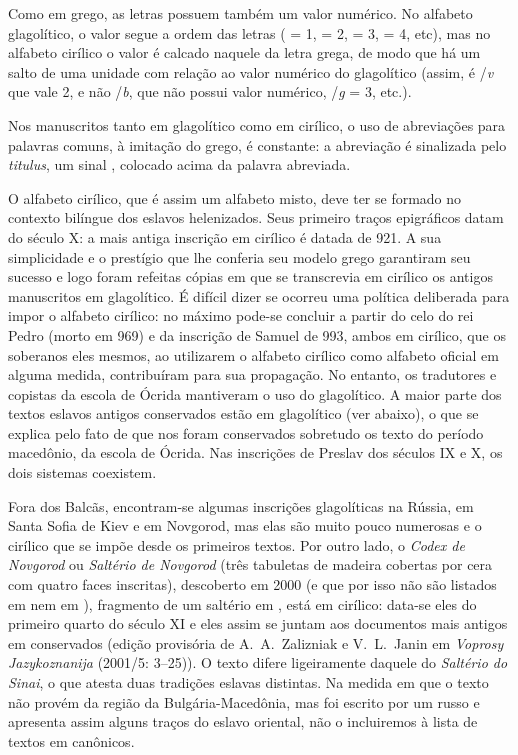 


Como em grego, as letras possuem também um valor numérico.
No alfabeto glagolítico, o valor segue a ordem das letras ( = 1,
 = 2,  = 3,  = 4, etc), mas no alfabeto
cirílico o valor é calcado naquele da letra grega, de modo que há um salto de
uma unidade com relação ao valor numérico do glagolítico (assim, é
\slash{}\emph{v} que vale 2, e não \slash{}\emph{b}, que não possui valor
numérico, \slash{}\emph{g} = 3, etc.).

Nos manuscritos tanto em glagolítico como em cirílico, o uso de abreviações para
palavras comuns, à imitação do grego, é constante: a abreviação é sinalizada
pelo \emph{titulus}, um sinal , colocado acima da palavra abreviada.

O alfabeto cirílico, que é assim um alfabeto misto, deve ter se formado no
contexto bilíngue dos eslavos helenizados.
Seus primeiro traços epigráficos datam do século X\@: a mais antiga inscrição em
cirílico é datada de 921.
A sua simplicidade e o prestígio que lhe conferia seu modelo grego garantiram
seu sucesso e logo foram refeitas cópias em que se transcrevia em cirílico os
antigos manuscritos em glagolítico.
É difícil dizer se ocorreu uma política deliberada para impor o alfabeto
cirílico: no máximo pode-se concluir a partir do celo do rei Pedro (morto em
969) e da inscrição de Samuel de 993, ambos em cirílico, que os soberanos eles
mesmos, ao utilizarem o alfabeto cirílico como alfabeto oficial em alguma
medida, contribuíram para sua propagação.
No entanto, os tradutores e copistas da escola de Ócrida mantiveram o uso do
glagolítico.
A maior parte dos textos eslavos antigos conservados estão em glagolítico (ver
abaixo), o que se explica pelo fato de que nos foram conservados sobretudo os
texto do período macedônio, da escola de Ócrida.
Nas inscrições de Preslav dos séculos IX e X, os dois sistemas coexistem.

Fora dos Balcãs, encontram-se algumas inscrições glagolíticas na Rússia, em Santa
Sofia de Kiev e em Novgorod, mas elas são muito pouco numerosas e o cirílico que
se impõe desde os primeiros textos.
Por outro lado, o \emph{Codex de Novgorod} ou \emph{Saltério de Novgorod} (três
tabuletas de madeira cobertas por cera com quatro faces inscritas), descoberto
em 2000 (e que por isso não são listados em \textcite{Schenker1995} nem em
\textcite{BirnbaumSchaeken1999}), fragmento de um saltério em ,
está em cirílico: data-se eles do primeiro quarto do século XI e eles assim se
juntam aos documentos mais antigos em  conservados (edição
provisória de A.~A.\ Zalizniak e V.~L.\ Janin em \emph{Voprosy Jazykoznanija}
(2001/5: 3--25)).
O texto difere ligeiramente daquele do \emph{Saltério do Sinai}, o que atesta
duas tradições eslavas distintas.
Na medida em que o texto não provém da região da Bulgária\hyp{}Macedônia, mas
foi escrito por um russo e apresenta assim alguns traços do eslavo oriental, não
o incluiremos à lista de textos em  canônicos.


